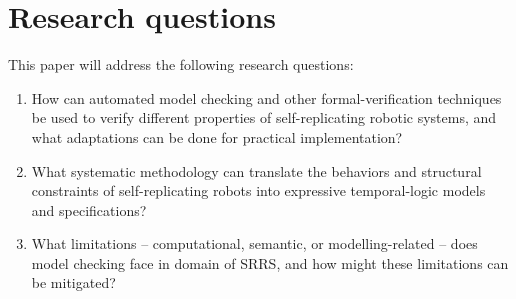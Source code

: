 
\chapter{Research questions} \label{research_questions}


This paper will address the following research questions:
\begin{enumerate}
    \item How can automated model checking and other formal-verification 
        techniques be used to verify different properties of 
        self-replicating robotic systems, and what adaptations 
        can be done for practical implementation?
    \item What systematic methodology can translate the behaviors and 
        structural constraints of self-replicating robots into expressive 
        temporal-logic models and specifications?
    \item What limitations -- computational, semantic, or 
        modelling-related -- does model checking face in domain of SRRS,
        and how might these limitations can be mitigated?\\


\end{enumerate}


